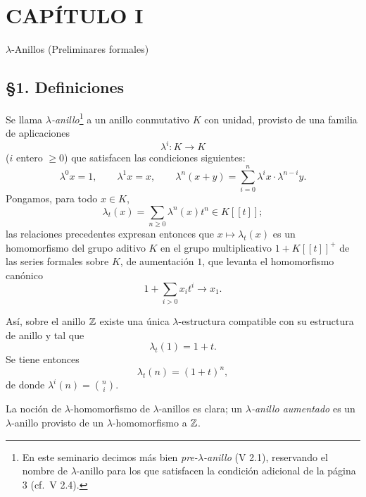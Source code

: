 \clearpage

\section*{CAPÍTULO I}
\begin{center}
$\lambda$-Anillos (Preliminares formales)
\end{center}

\subsection*{\S 1. Definiciones}

Se llama \emph{$\lambda$-anillo}\footnote{En este seminario decimos más bien \emph{pre-$\lambda$-anillo} (V 2.1), reservando el nombre de $\lambda$-anillo para los que satisfacen la condición adicional de la página 3 (cf.\ V 2.4).} a un anillo conmutativo $K$ con unidad, provisto de una familia de aplicaciones
\begin{equation}\tag{1.1}
\lambda^i:K\longrightarrow K
\end{equation}
($i$ entero $\geq 0$) que satisfacen las condiciones siguientes:
\begin{equation}\tag{1.2}
\lambda^0x=1,\qquad \lambda^1x=x,\qquad
\lambda^n(x+y)=\sum_{i=0}^n\lambda^ix\cdot\lambda^{n-i}y.
\end{equation}
Pongamos, para todo $x\in K$,
\begin{equation}\tag{1.3}
\lambda_t(x)=\sum_{n\geq 0}\lambda^n(x)t^n\in K[[t]] ;
\end{equation}
las relaciones precedentes expresan entonces que $x\longmapsto\lambda_t(x)$ es un homomorfismo del grupo aditivo $K$ en el grupo multiplicativo $1+K[[t]]^+$ de las series formales sobre $K$, de aumentación $1$, que levanta el homomorfismo canónico
\[
1+\sum_{i>0}x_it^i\longrightarrow x_1.
\]

Así, sobre el anillo $\mathbb Z$ existe una única $\lambda$-estructura compatible con su estructura de anillo y tal que
\begin{equation}\tag{1.4}
\lambda_t(1)=1+t.
\end{equation}
Se tiene entonces
\begin{equation}\tag{1.5}
\lambda_t(n)=(1+t)^n,
\end{equation}
de donde $\lambda^i(n)=\binom{n}{i}$.

La noción de $\lambda$-homomorfismo de $\lambda$-anillos es clara; un \emph{$\lambda$-anillo aumentado} es un $\lambda$-anillo provisto de un $\lambda$-homomorfismo a $\mathbb Z$.

